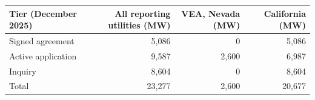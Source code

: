 \begin{tabular}{lrrr}
\toprule
Tier (December 2025) & All reporting utilities (MW) & VEA, Nevada (MW) & California (MW) \\
\midrule
Signed agreement & 5,086 & 0 & 5,086 \\
Active application & 9,587 & 2,600 & 6,987 \\
Inquiry & 8,604 & 0 & 8,604 \\
\midrule
Total & 23,277 & 2,600 & 20,677 \\
\bottomrule
\end{tabular}